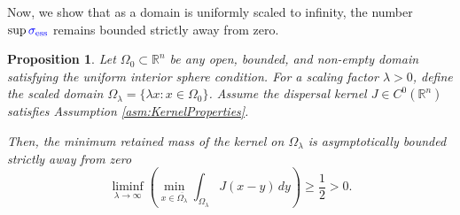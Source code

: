 \documentclass[12pt, a4paper]{article}
\newcommand{\revision}[1]{\textcolor{blue}{#1}}
\theoremstyle{break}
\theoremstyle{break}
\newtheorem{prp}{Proposition}[section]
\theoremstyle{break}
\theoremstyle{break}
\theoremstyle{break}
\theoremstyle{break}
\theoremstyle{break}
\theoremstyle{break}
\theoremstyle{break}
\begin{document}
Now, we show that as a domain is uniformly scaled to infinity, the number $\sup \revision{\sigma_{\mathrm{ess}}}$ remains bounded strictly away from zero.

\begin{prp}
    \label{prp:retained_mass_limit}
    Let $\Omega_0 \subset \mathbb{R}^n$ be any open, bounded, and non-empty domain satisfying the uniform interior sphere condition. For a scaling factor $\lambda > 0$, define the scaled domain $\Omega_\lambda = \{ \lambda x : x \in \Omega_0 \}$. Assume the dispersal kernel $J \in C^0(\mathbb{R}^n)$ satisfies Assumption \ref{asm:KernelProperties}.
    
    Then, the minimum retained mass of the kernel on $\Omega_\lambda$ is asymptotically bounded strictly away from zero
    \begin{equation}
        \liminf_{\lambda \to \infty} \left( \min_{x \in \overline{\Omega_\lambda}} \int_{\Omega_\lambda} J(x-y) \, dy \right) \geq \frac{1}{2} > 0.
    \end{equation}
\end{prp}
\end{document}
